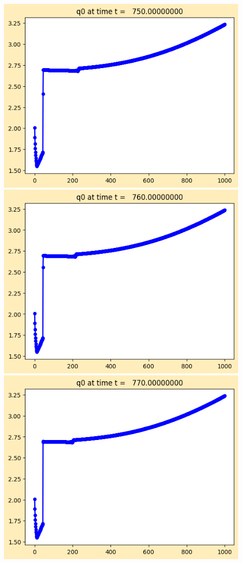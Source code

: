 \documentclass[11pt]{article}
\begin{document}
\vskip 10pt 
\includegraphics[width=0.95\textwidth]{frame0075fig1.png}
\vskip 10pt 
\includegraphics[width=0.95\textwidth]{frame0076fig1.png}
\vskip 10pt 
\includegraphics[width=0.95\textwidth]{frame0077fig1.png}
\end{document}
